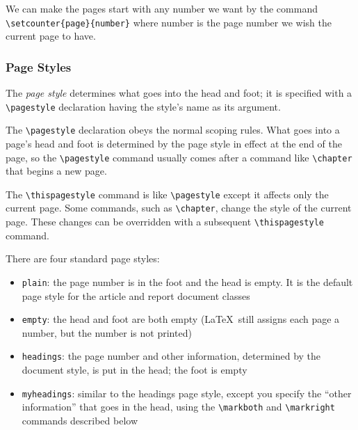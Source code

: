 \documentclass{article}
\begin{document}
We can make the pages start with any number we want by the command \verb:\setcounter{page}{number}:
where number is the page number we wish the current page to have.

\subsubsection{Page Styles}

The \emph{page style} determines what goes into the head and foot; it is specified with
a \verb:\pagestyle: declaration having the style's name as its argument.

The \verb:\pagestyle: declaration obeys the normal scoping rules. What goes into a page's head and
foot is determined by the page style in effect at the end of the page, so the \verb:\pagestyle:
command usually comes after a command like \verb:\chapter: that begins a new page.

The \verb:\thispagestyle: command is like \verb:\pagestyle: except it affects only the current page.
Some commands, such as \verb:\chapter:, change the style of the current page. These changes can be
overridden with a subsequent \verb:\thispagestyle: command. 

There are four standard page styles:

\begin{itemize}
   \item \texttt{plain}: the page number is in the foot and the head is empty. It is the default
    page style for the article and report document classes

   \item \texttt{empty}: the head and foot are both empty (\LaTeX\ still assigns each page a number,
    but the number is not printed)
   
   \item \texttt{headings}: the page number and other information, determined by the document style,
    is put in the head; the foot is empty
   
   \item \texttt{myheadings}: similar to the headings page style, except you specify the ``other
    information'' that goes in the head, using the \verb:\markboth: and \verb:\markright: commands
    described below
\end{itemize}
\end{document}
